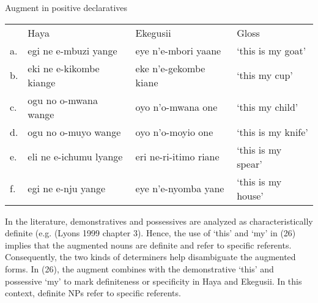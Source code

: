 \documentclass[output=paper]{langscibook}
\begin{document}
\begin{exe}
\ex Augment in positive declaratives\\
\label{hayagusii26}
\begin{tabular}{llll}
         &    Haya		&		Ekegusii	&		Gloss	\\	 
a. &	egi ne e-mbuzi yange &		eye n’e-mbori	yaane	&	‘this is my goat’  \\ 		
b. &	eki ne e-kikombe kiange	& eke n’e-gekombe kiane	 &‘this my cup’\\
c. &	ogu no o-mwana wange &	oyo n’o-mwana one	&	‘this my child’	\\
d. &	ogu no o-muyo wange   &	oyo n’o-moyio one	&	‘this is my knife’\\
e. &	eli ne e-ichumu lyange &	eri ne-ri-itimo riane	&	‘this is my spear’\\
f. &	egi ne e-nju yange	&	eye n’e-nyomba yane	 &	‘this is my house’ \\

\end{tabular}
\end{exe}
In the literature, demonstratives and possessives are analyzed as characteristically definite (e.g. (Lyons 1999 chapter 3). Hence, the use of ‘this’ and ‘my’ in (26) implies that the augmented nouns are definite and refer to specific referents. Consequently, the two kinds of determiners help disambiguate the augmented forms. In (26), the augment combines with the demonstrative ‘this’ and possessive ‘my’ to mark definiteness or specificity in Haya and Ekegusii. In this context, definite NPs refer to specific referents.
\end{document}
